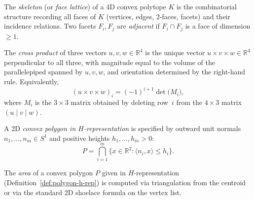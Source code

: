 \begin{unverified}
\begin{definition}\label{def:face-lattice}
The \emph{skeleton} (or \emph{face lattice}) of a 4D convex polytope $K$
is the combinatorial structure recording all faces of $K$
(vertices, edges, 2-faces, facets) and their incidence relations.
Two facets $F_i, F_j$ are \emph{adjacent} if $F_i \cap F_j$ is a
face of dimension $\geq 1$.
\end{definition}
\end{unverified}


\begin{unverified}
\begin{definition}\label{def:cross-product-4d}
The \emph{cross product} of three vectors $u, v, w \in \mathbb{R}^4$
is the unique vector $u \times v \times w \in \mathbb{R}^4$
perpendicular to all three, with magnitude equal to the volume
of the parallelepiped spanned by $u, v, w$, and orientation
determined by the right-hand rule.
Equivalently,
\[
  (u \times v \times w)_i
  = (-1)^{i+1} \det\bigl(M_i\bigr),
\]
where $M_i$ is the $3 \times 3$ matrix obtained by deleting
row~$i$ from the $4 \times 3$ matrix $(u \mid v \mid w)$.
\end{definition}
\end{unverified}



\begin{unverified}
\begin{definition}\label{def:polygon-h-rep}
A 2D \emph{convex polygon in $H$-representation} is specified by
outward unit normals $n_1, \ldots, n_m \in S^1$ and positive
heights $h_1, \ldots, h_m > 0$:
\[
  P = \bigcap_{i=1}^{m} \{x \in \mathbb{R}^2 : \langle n_i, x \rangle \leq h_i\}.
\]
\end{definition}
\end{unverified}


\begin{unverified}
\begin{definition}\label{def:polygon-area}
The \emph{area} of a convex polygon $P$ given in $H$-representation
(Definition~\ref{def:polygon-h-rep}) is computed via triangulation
from the centroid or via the standard 2D shoelace formula on the vertex list.
\end{definition}
\end{unverified}


